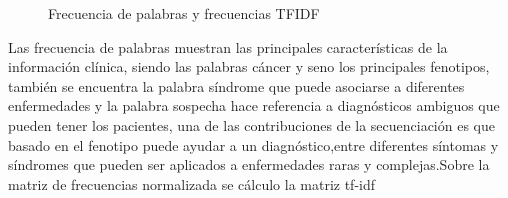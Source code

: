 \begin{figure}[H]
	\centering
	\caption{Frecuencia de palabras y frecuencias TFIDF} \label{fig:sin}
\end{figure}


Las frecuencia de palabras muestran las principales características de la información clínica, siendo las palabras cáncer y seno los principales fenotipos, también se encuentra la palabra síndrome que puede asociarse a diferentes  enfermedades y la palabra sospecha hace referencia a diagnósticos ambiguos que pueden tener los pacientes, una de las contribuciones de la secuenciación es que basado en el fenotipo puede ayudar a un diagnóstico,entre diferentes síntomas y síndromes que pueden ser aplicados a enfermedades raras y complejas\cite{Tetreault2015a}.Sobre  la matriz  de frecuencias normalizada se cálculo la matriz tf-idf \\


